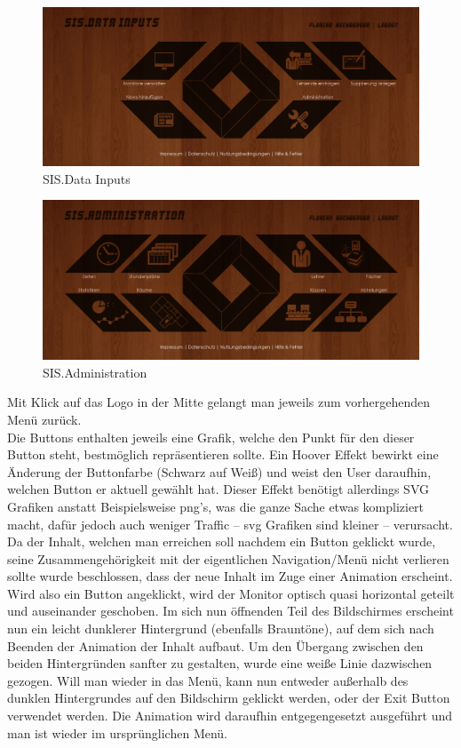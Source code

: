 \begin{figure}[H]
\centering
\includegraphics[keepaspectratio=true, width=14cm]{images/screenshots/data-inputs_nohover.png}
\caption{SIS.Data Inputs}
\label{fig:content_draft_design_datainputs}
\end{figure}
\begin{figure}[H]
\centering
\includegraphics[keepaspectratio=true, width=14cm]{images/screenshots/administration_nohover.png}
\caption{SIS.Administration}
\label{fig:content_draft_design_administration}
\end{figure}
Mit Klick auf das Logo in der Mitte gelangt man jeweils zum vorhergehenden Menü zurück.\\
Die Buttons enthalten jeweils eine Grafik, welche den Punkt für den dieser Button steht, bestmöglich repräsentieren sollte. Ein Hoover Effekt bewirkt eine Änderung der Buttonfarbe (Schwarz auf Weiß) und weist den User daraufhin, welchen Button er aktuell gewählt hat. Dieser Effekt benötigt allerdings SVG Grafiken anstatt Beispielsweise png's, was die ganze Sache etwas kompliziert macht, dafür jedoch auch weniger Traffic – svg Grafiken sind kleiner – verursacht.\\
Da der Inhalt, welchen man erreichen soll nachdem ein Button geklickt wurde, seine Zusammengehörigkeit mit der eigentlichen Navigation/Menü nicht verlieren sollte wurde beschlossen, dass der neue Inhalt im Zuge einer Animation erscheint. Wird also ein Button angeklickt, wird der Monitor optisch quasi horizontal geteilt und auseinander geschoben. Im sich nun öffnenden Teil des Bildschirmes erscheint nun ein leicht dunklerer Hintergrund (ebenfalls Brauntöne), auf dem sich nach Beenden der Animation der Inhalt aufbaut. Um den Übergang zwischen den beiden Hintergründen sanfter zu gestalten, wurde eine weiße Linie dazwischen gezogen. Will man wieder in das Menü, kann nun entweder außerhalb des dunklen Hintergrundes auf den Bildschirm geklickt werden, oder der Exit Button verwendet werden. Die Animation wird daraufhin entgegengesetzt ausgeführt und man ist wieder im ursprünglichen Menü.\\

